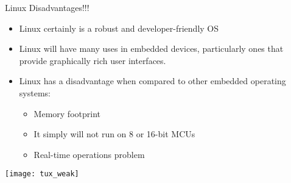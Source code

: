 \begin{frame}{Linux Disadvantages!!!}

\begin{itemize}
    \item
     Linux certainly is a robust and developer-friendly OS
     \item Linux will have many uses in embedded devices, particularly
ones that provide graphically rich user interfaces.
\item
Linux has a disadvantage when compared to other embedded operating systems:
\begin{itemize}
\item Memory footprint
\item It simply will not run on 8 or 16-bit MCUs
\item Real-time operations problem
\end{itemize}
\end{itemize}


        \centering
  \texttt{[image: tux\_weak]}


\end{frame}